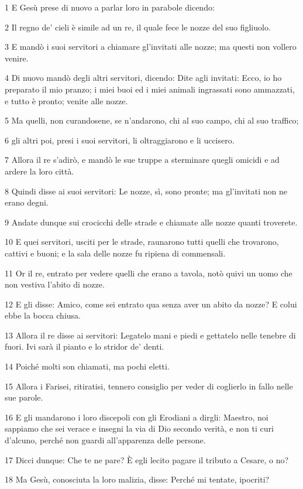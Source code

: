 \par 1 E Gesù prese di nuovo a parlar loro in parabole dicendo:
\par 2 Il regno de' cieli è simile ad un re, il quale fece le nozze del suo figliuolo.
\par 3 E mandò i suoi servitori a chiamare gl'invitati alle nozze; ma questi non vollero venire.
\par 4 Di nuovo mandò degli altri servitori, dicendo: Dite agli invitati: Ecco, io ho preparato il mio pranzo; i miei buoi ed i miei animali ingrassati sono ammazzati, e tutto è pronto; venite alle nozze.
\par 5 Ma quelli, non curandosene, se n'andarono, chi al suo campo, chi al suo traffico;
\par 6 gli altri poi, presi i suoi servitori, li oltraggiarono e li uccisero.
\par 7 Allora il re s'adirò, e mandò le sue truppe a sterminare quegli omicidi e ad ardere la loro città.
\par 8 Quindi disse ai suoi servitori: Le nozze, sì, sono pronte; ma gl'invitati non ne erano degni.
\par 9 Andate dunque sui crocicchi delle strade e chiamate alle nozze quanti troverete.
\par 10 E quei servitori, usciti per le strade, raunarono tutti quelli che trovarono, cattivi e buoni; e la sala delle nozze fu ripiena di commensali.
\par 11 Or il re, entrato per vedere quelli che erano a tavola, notò quivi un uomo che non vestiva l'abito di nozze.
\par 12 E gli disse: Amico, come sei entrato qua senza aver un abito da nozze? E colui ebbe la bocca chiusa.
\par 13 Allora il re disse ai servitori: Legatelo mani e piedi e gettatelo nelle tenebre di fuori. Ivi sarà il pianto e lo stridor de' denti.
\par 14 Poiché molti son chiamati, ma pochi eletti.
\par 15 Allora i Farisei, ritiratisi, tennero consiglio per veder di coglierlo in fallo nelle sue parole.
\par 16 E gli mandarono i loro discepoli con gli Erodiani a dirgli: Maestro, noi sappiamo che sei verace e insegni la via di Dio secondo verità, e non ti curi d'alcuno, perché non guardi all'apparenza delle persone.
\par 17 Dicci dunque: Che te ne pare? È egli lecito pagare il tributo a Cesare, o no?
\par 18 Ma Gesù, conosciuta la loro malizia, disse: Perché mi tentate, ipocriti?
